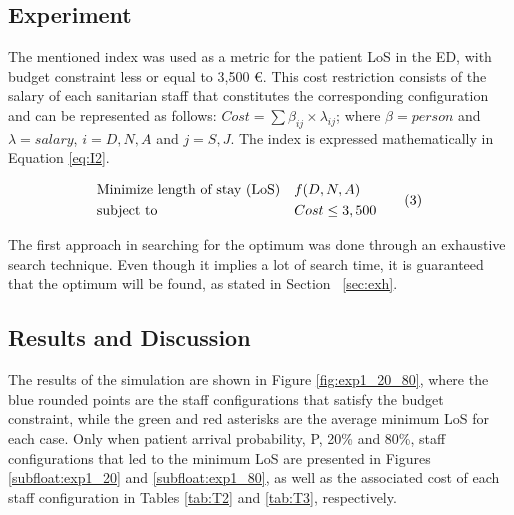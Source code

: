 \documentclass[11pt]{article} %
\begin{document}
\subsection {Experiment}
\label{sec:exp}

The mentioned index was used as a metric for the patient LoS in the ED, with budget constraint less or equal to 3,500 \euro . This cost restriction consists of the salary of each sanitarian staff that constitutes the corresponding configuration and can be represented as follows: $ Cost = \sum \beta_{ij} \times \lambda _{ij} $; where $\beta = person$ and $\lambda = salary$, $i = D, N, A$ and $j = S, J$.  The index is expressed mathematically in Equation \eqref{eq:I2}.

\vspace{-0.05cm}
\begin{equation*}  \label{eq:I2}
\vspace{-0.05cm}
\begin{aligned}
& {\text{Minimize length of stay (LoS)}}
& & f(D,N,A) \\
& \text{subject to}
& & Cost \le 3,500 
\end{aligned}
\tag{3}
\end{equation*}

The first approach in searching for the optimum was done through an exhaustive search technique. Even though it implies a lot of search time, it is guaranteed that the optimum will be found, as stated in Section ~\ref{sec:exh}.

\subsection {Results and Discussion}

The results of the simulation are shown in Figure \ref{fig:exp1_20_80}, where the blue rounded points are the staff configurations 
that satisfy the budget constraint, while the green and red asterisks are the average minimum LoS for each case. Only when patient 
arrival probability, P,  20\% and 80\%, staff configurations that led to the minimum LoS are presented in Figures 
\ref{subfloat:exp1_20}  and \ref{subfloat:exp1_80}, as well as the associated cost of each staff configuration in Tables \ref{tab:T2} 
and \ref{tab:T3}, respectively.
\end{document}
